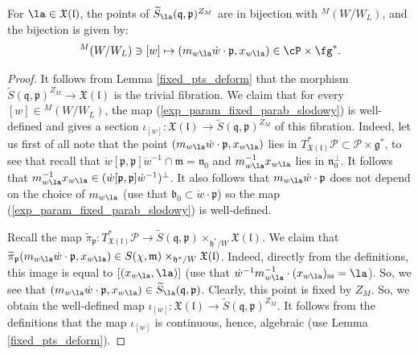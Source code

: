 \documentclass[12pt]{amsart}
\begin{document}
\begin{prop}\label{descr_fixed_parabolic}
For $\la \in \mathfrak{X}(\mathfrak{l})$, the points of $\widetilde{S}_{\la}(\mathfrak{q},\mathfrak{p})^{Z_M}$ are in bijection with ${}^M(W/W_{L})$, and the bijection is given by: 
\begin{equation}\label{exp_param_fixed_parab_slodowy}
{}^M(W/W_{L}) \ni [w] \mapsto (m_{w\la}\dot{w} \cdot \mathfrak{p},x_{w\la})\in \cP\times \fg^*.
\end{equation}
\end{prop}
\begin{proof}
It follows from Lemma \ref{fixed_pts_deform} that the morphism $\widetilde{S}(\mathfrak{q},\mathfrak{p})^{Z_M} \rightarrow \mathfrak{X}(\mathfrak{l})$ is the trivial fibration. We claim that for every  $[w] \in {}^M(W/W_L)$, the map (\ref{exp_param_fixed_parab_slodowy}) is well-defined and gives a section $\iota_{[w]}\colon \mathfrak{X}(\mathfrak{l}) \rightarrow \widetilde{S}(\mathfrak{q},\mathfrak{p})^{Z_M}$ of this fibration.  
Indeed, let us first of all note that the point $(m_{w\la}\dot{w} \cdot \mathfrak{p},x_{w\la})$ lies in $T^*_{\mathfrak{X}(\mathfrak{l})}\mathcal{P} \subset \mathcal{P} \times \mathfrak{g}^*$, to see that recall that $\dot{w}[\mathfrak{p},\mathfrak{p}]\dot{w}^{-1} \cap \mathfrak{m} = \mathfrak{n}_0$ and $m_{w\la}^{-1}x_{w\la}$  lies in $\mathfrak{n}_0^{\perp}$.  It follows that $m_{w\la}^{-1}x_{w\la} \in (\dot{w}[\mathfrak{p},\mathfrak{p}]\dot{w}^{-1})^{\perp}$. 
It also follows that $m_{w\la}\dot{w} \cdot \mathfrak{p}$ does not depend on the choice of $m_{w\la}$ (use that $\mathfrak{b}_0 \subset \dot{w} \cdot \mathfrak{p}$) so the map (\ref{exp_param_fixed_parab_slodowy}) is well-defined.


Recall the map $\widetilde{\pi}_{\mathfrak{p}}\colon T^*_{\mathfrak{X}(\mathfrak{l})}\mathcal{P} \rightarrow \widetilde{S}(\mathfrak{q},\mathfrak{p}) \times_{\mathfrak{h}^*/W} \mathfrak{X}(\mathfrak{l})$.
We claim that $\widetilde{\pi}_{\mathfrak{p}}(m_{w\la}\dot{w} \cdot \mathfrak{p},x_{w\la}) \in S(\chi,\mathfrak{m}) \times_{\mathfrak{h}^*/W} \mathfrak{X}(\mathfrak{l})$.  Indeed, directly from the definitions, this image is equal to $[(x_{w\la},\la)]$ (use that $\dot{w}^{-1}m_{w\la}^{-1} \cdot (x_{w\la})_{\mathrm{ss}}=\la$). So, we see that $(m_{w\la}\dot{w} \cdot \mathfrak{p},x_{w\la}) \in \widetilde{S}_{\la}(\mathfrak{q},\mathfrak{p})$. Clearly, this point is fixed by $Z_M$. So, we obtain the well-defined map $\iota_{[w]}\colon \mathfrak{X}(\mathfrak{l}) \rightarrow \widetilde{S}(\mathfrak{q},\mathfrak{p})^{Z_M}$. 
It follows from the definitions that the map $\iota_{[w]}$ is continuous, hence, algebraic (use Lemma \ref{fixed_pts_deform}).




\end{proof}
\end{document}
